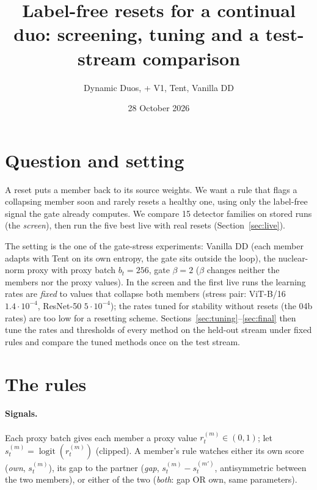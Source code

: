 \documentclass[10pt]{article}
\title{Label-free resets for a continual duo: screening, tuning and a test-stream comparison}
\author{Dynamic Duos, \vit{} + \rn{} V1, Tent, Vanilla DD}
\date{28 October 2026}
\newcommand{\vit}{ViT-B/16}
\newcommand{\rn}{ResNet-50}
\begin{document}
\maketitle

\section{Question and setting}
A reset puts a member back to its source weights. We want a rule that flags a collapsing member soon and rarely resets a healthy one, using only the label-free signal the gate already computes.
We compare 15 detector families on stored runs (the \emph{screen}), then run the five best live with real resets (Section~\ref{sec:live}).

The setting is the one of the gate-stress experiments: Vanilla DD (each member adapts with Tent on its own entropy, the gate sits outside the loop), the nuclear-norm proxy with proxy batch $b_t = 256$, gate $\beta = 2$ ($\beta$ changes neither the members nor the proxy values).
In the screen and the first live runs the learning rates are \emph{fixed} to values that collapse both members (stress pair: \vit{} $1.4{\cdot}10^{-4}$, \rn{} $5{\cdot}10^{-4}$); the rates tuned for stability without resets (the 04b rates) are too low for a resetting scheme. Sections~\ref{sec:tuning}--\ref{sec:final} then tune the rates and thresholds of every method on the held-out stream under fixed rules and compare the tuned methods once on the test stream.

\section{The rules}
\paragraph{Signals.} Each proxy batch gives each member a proxy value $r^{(m)}_t \in (0,1)$; let $s^{(m)}_t = \operatorname{logit}(r^{(m)}_t)$ (clipped). A member's rule watches either its own score (\emph{own}, $s^{(m)}_t$), its gap to the partner (\emph{gap}, $s^{(m)}_t - s^{(m')}_t$, antisymmetric between the two members), or either of the two (\emph{both}: gap OR own, same parameters).
\end{document}
